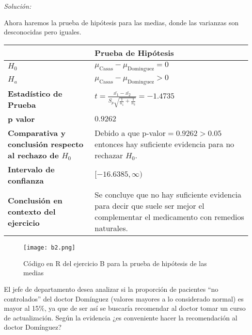\documentclass[12pt]{article}
\newenvironment{problem}[2][Problema]{\begin{trivlist}
\item[\hskip \labelsep {\bfseries #1}\hskip \labelsep {\bfseries #2.}]}{\end{trivlist}}
\newenvironment{sol}
    {\emph{Solución:}
    }
    {
    }
\begin{document}
\begin{sol}
Ahora haremos la prueba de hipótesis para las medias, donde las varianzas son desconocidas pero iguales.
\begin{table}[h!]
\centering
\begin{tabular}{|>{\raggedright\arraybackslash}m{6cm}|>{\raggedright\arraybackslash}m{6cm}|}
\hline
 & \textbf{Prueba de Hipótesis} \\ \hline
$H_0$ & $\mu_{\text{Casas}}-\mu_{\text{Dominguez}}=0$ \\ \hline
$H_a$ & $\mu_{\text{Casas}}-\mu_{\text{Dominguez}}>0$ \\ \hline
\textbf{Estadístico de Prueba} & \vspace{0.5cm}$t=\frac{\bar{x_1}-\bar{x_2}}{S_p\sqrt{\frac{1}{n_1}+\frac{1}{n_2}}}=-1.4735$\vspace{0.5cm} \\ \hline
\textbf{p valor} & $0.9262$ \\ \hline
\textbf{Comparativa y conclusión respecto al rechazo de $H_0$} & Debido a que p-valor$=0.9262>0.05$ entonces hay suficiente evidencia para no rechazar $H_0$. \\ \hline
\textbf{Intervalo de confianza} & $[-16.6385, \infty)$ \\ \hline
\textbf{Conclusión en contexto del ejercicio} & Se concluye que no hay suficiente evidencia para decir que suele ser mejor el complementar el medicamento con remedios naturales. \\ \hline
\end{tabular}
\label{tab:hipotesis}
\end{table}
\pagebreak
\begin{figure}[h]  %
    \centering      %
    \texttt{[image: b2.png]} 
    \caption{Código en R del ejercicio B para la prueba de hipótesis de las medias}
\end{figure}
\end{sol}
\pagebreak
\begin{problem}{C}
El jefe de departamento desea analizar si la proporción de pacientes “no controlados” del doctor Domínguez (valores mayores a lo considerado normal) es mayor al 15\%, ya que de ser así se buscaría recomendar al doctor tomar un curso de actualización. Según la evidencia ¿es conveniente hacer la recomendación al doctor Domínguez?
\end{problem}
\end{document}
